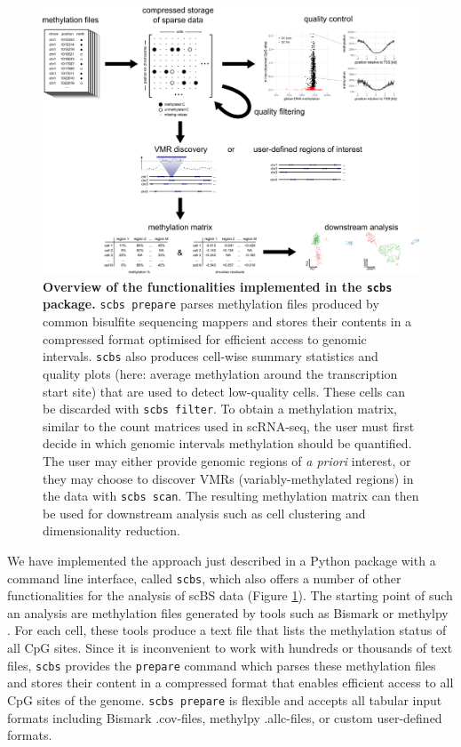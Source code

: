 \documentclass[twocolumn,10pt]{article}
\begin{document}
\begin{figure}[t]
	\begin{center}
		\includegraphics[width=.8\textwidth]{figures/Fig_workflow.png}
	\end{center}
	\caption{\small \textbf{Overview of the functionalities implemented in the \texttt{scbs} package.}
		\texttt{scbs prepare} parses methylation files produced by common bisulfite sequencing mappers and stores their contents in a compressed format optimised for efficient access to genomic intervals.
		\texttt{scbs} also produces cell-wise summary statistics and quality plots (here: average methylation around the transcription start site) that are used to detect low-quality cells.
		These cells can be discarded with \texttt{scbs filter}.
		To obtain a methylation matrix, similar to the count matrices used in scRNA-seq, the user must first decide in which genomic intervals methylation should be quantified.
		The user may either provide genomic regions of \emph{a priori} interest, or they may choose to discover VMRs (variably-methylated regions) in the data with \texttt{scbs scan}.
		The resulting methylation matrix can then be used for downstream analysis such as cell clustering and dimensionality reduction.
	}
	\label{workflow}
\end{figure}

We have implemented the approach just described in a Python package with a command line interface, called \texttt{scbs}, which also offers a number of other functionalities for the analysis of scBS data (Figure \ref{workflow}). The starting point of such an analysis are methylation files generated by tools such as Bismark \citep{bismark} or methylpy \citep{methylpy}. For each cell, these tools produce a text file that lists the methylation status of all CpG sites. Since it is inconvenient to work with hundreds or thousands of text files, \texttt{scbs} provides the \texttt{prepare} command which parses these methylation files and stores their content in a compressed format that enables efficient access to all CpG sites of the genome. \texttt{scbs prepare} is flexible and accepts all tabular input formats including Bismark .cov-files, methylpy .allc-files, or custom user-defined formats.
\end{document}
